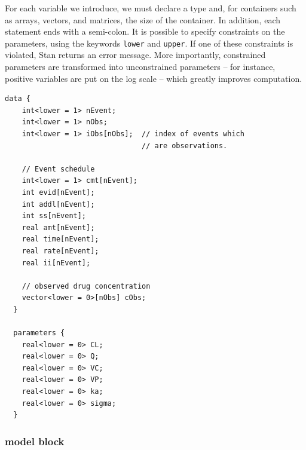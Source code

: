 For each variable we introduce, we must declare a type and, for containers such as arrays, vectors, and matrices, the size of the container.
In addition, each statement ends with a semi-colon.
It is possible to specify constraints on the parameters, using the keywords \texttt{lower} and \texttt{upper}.
If one of these constraints is violated, Stan returns an error message.
More importantly, constrained parameters are transformed into unconstrained parameters -- for instance, positive variables are put on the log scale -- which greatly improves computation.

\begin{lstlisting}[style=stan, numbers=none] 
  data {
    int<lower = 1> nEvent;
    int<lower = 1> nObs;
    int<lower = 1> iObs[nObs];  // index of events which
                                // are observations.

    // Event schedule
    int<lower = 1> cmt[nEvent];
    int evid[nEvent];
    int addl[nEvent];
    int ss[nEvent];
    real amt[nEvent];
    real time[nEvent];
    real rate[nEvent];
    real ii[nEvent];

    // observed drug concentration
    vector<lower = 0>[nObs] cObs;
  }
  
  parameters {
    real<lower = 0> CL;
    real<lower = 0> Q;
    real<lower = 0> VC;
    real<lower = 0> VP;
    real<lower = 0> ka;
    real<lower = 0> sigma;
  }
\end{lstlisting}

\subsubsection{model block}

